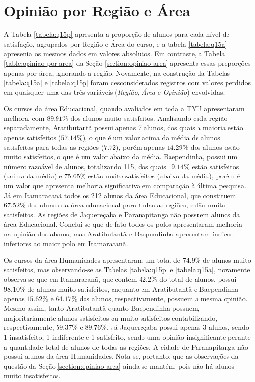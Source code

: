\documentclass[10pt,a4paper,oneside]{article}
\newcommand{\arat}{Aratibutantã\xspace}
\newcommand{\baep}{Baependinha\xspace}
\newcommand{\itam}{Itamaracanã\xspace}
\newcommand{\jaqu}{Jaquereçaba\xspace}
\newcommand{\para}{Paranapitanga\xspace}
\newcommand{\edu}{Educacional\xspace}
\newcommand{\hum}{Humanidades\xspace}
\begin{document}
\section{Opinião por Região e Área}
\label{section:opiniao-regiao-area}

A Tabela \ref{tabela:q15p} apresenta a proporção de alunos para cada nível de satisfação, agrupados por Região e Área do curso, e a tabela \ref{tabela:q15a} apresenta os mesmos dados em valores absolutos. Em contraste, a Tabela \ref{table:opiniao-por-area} da Seção \ref{section:opiniao-area} apresenta essas proporções apenas por área, ignorando a região. Novamente, na construção da Tabelas \ref{tabela:q15a} e \ref{tabela:q15p} foram desconsiderados registros com valores perdidos em quaisquer uma das três variáveis (\textit{Região}, \textit{Área} e \textit{Opinião}) envolvidas. 




Os cursos da área \edu, quando avaliados em toda a TYU apresentaram melhora, com $89.91\%$ dos alunos muito satisfeitos. Analisando cada região separadamente, \arat possui apenas 7 alunos, dos quais a maioria estão apenas satisfeitos ($57.14\%$), o que é um valor acima da média de alunos satisfeitos para todas as regiões ($7.72$), porém apenas $14.29\%$ dos alunos estão muito satisfeitos, o que é um valor abaixo da média. \baep, possui um número razoável de alunos, totalizando 115, dos quais $19.14\%$ estão satisfeitos (acima da média) e $75.65\%$ estão muito satisfeitos (abaixo da média), porém é um valor que apresenta melhoria significativa em comparação à última pesquisa. Já em \itam todos os 212 alunos da área \edu, que constituem $67.52\%$ dos alunos da área educacional para todas as regiões, estão muito satisfeitos. As regiões de \jaqu e \para não possuem alunos da área \edu. Conclui-se que de fato todos os polos apresentaram melhoria na opinião dos alunos, mas \arat e \baep apresentam índices inferiores ao maior polo em \itam.

Os cursos da área \hum apresentaram um total de $74.9\%$ de alunos muito satisfeitos, mas observando-se as Tabelas \ref{tabela:q15p} e \ref{tabela:q15a}, novamente observa-se que em \itam, que contem $42.2\%$ do total de alunos, possui  $98.10\%$ de alunos muito satisfeitos, enquanto em \arat e \baep apenas $15.62\%$ e $64.17\%$ dos alunos, respectivamente, possuem a mesma opinião. Mesmo assim, tanto \arat quanto \baep possuem, majoritariamente alunos satisfeitos ou muito satisfeitos contabilizando, respectivamente, $59.37\%$ e $89.76\%$. Já \jaqu possui apenas 3 alunos, sendo 1 insatisfeito, 1 indiferente e 1 satisfeito, sendo uma opinião insignificante perante a quantidade total de alunos de todas as regiões. A cidade de \para não possui alunos da área \hum. Nota-se, portanto, que as observações da questão da Seção \ref{section:opiniao-area} ainda se mantém, pois não há alunos muito insatisfeitos.
\end{document}
